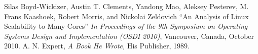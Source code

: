 \begin{thebibliography}{9}
Silas Boyd-Wickizer, Austin T. Clements, Yandong Mao, Aleksey Pesterev,
M. Frans Kaashoek, Robert Morris, and Nickolai Zeldovich
``An Analysis of Linux Scalability to Many Cores''
{\em In Proceedings of the 9th Symposium on Operating Systems Design and Implementation (OSDI 2010)}, Vancouver, Canada, October 2010.
A. N. Expert,
{\em A Book He Wrote,}
His Publisher, 1989.
\end{thebibliography}

